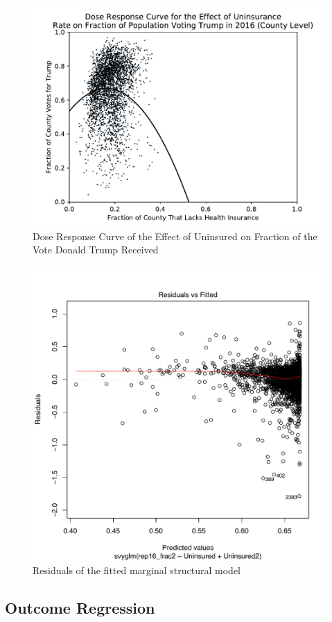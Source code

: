 \documentclass[11pt, conference,compsoc]{IEEEtran}
\begin{document}
\begin{figure} 
	\centering
	\includegraphics[width=.5\textwidth]{dose-response-scatter}
	\caption{Dose Response Curve of the Effect of Uninsured on Fraction of the Vote Donald Trump Received}
    \label{dose-response}
\end{figure}
\begin{figure} 
	\centering
	\includegraphics[width=.5\textwidth]{MSM_Residuals}
	\caption{Residuals of the fitted marginal structural model}
    \label{residuals}
\end{figure}
  

\subsection{Outcome Regression}
\end{document}
